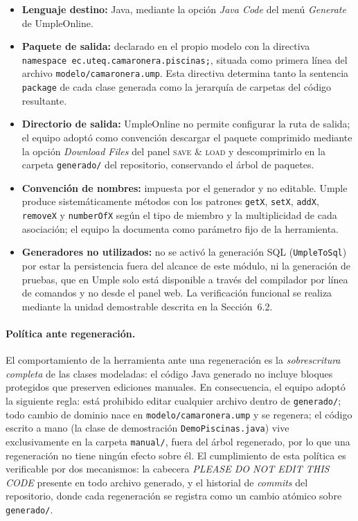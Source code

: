 \begin{itemize}
  \item \textbf{Lenguaje destino:} Java, mediante la opción
        \emph{Java Code} del menú \emph{Generate} de UmpleOnline.
  \item \textbf{Paquete de salida:} declarado en el propio modelo con
        la directiva \texttt{namespace ec.uteq.camaronera.piscinas;},
        situada como primera línea del archivo
        \texttt{modelo/camaronera.ump}. Esta directiva determina tanto
        la sentencia \texttt{package} de cada clase generada como la
        jerarquía de carpetas del código resultante.
  \item \textbf{Directorio de salida:} UmpleOnline no permite
        configurar la ruta de salida; el equipo adoptó como convención
        descargar el paquete comprimido mediante la opción
        \emph{Download Files} del panel \textsc{save \& load} y
        descomprimirlo en la carpeta \texttt{generado/} del
        repositorio, conservando el árbol de paquetes.
  \item \textbf{Convención de nombres:} impuesta por el generador y no
        editable. Umple produce sistemáticamente métodos con los
        patrones \texttt{getX}, \texttt{setX}, \texttt{addX},
        \texttt{removeX} y \texttt{numberOfX} según el tipo de miembro
        y la multiplicidad de cada asociación; el equipo la documenta
        como parámetro fijo de la herramienta.
  \item \textbf{Generadores no utilizados:} no se activó la generación
        SQL (\texttt{UmpleToSql}) por estar la persistencia fuera del
        alcance de este módulo, ni la generación de pruebas, que en
        Umple solo está disponible a través del compilador por línea
        de comandos y no desde el panel web. La verificación funcional
        se realiza mediante la unidad demostrable descrita en la
        Sección~6.2.
\end{itemize}

\paragraph{Política ante regeneración.}
El comportamiento de la herramienta ante una regeneración es la
\emph{sobrescritura completa} de las clases modeladas: el código Java
generado no incluye bloques protegidos que preserven ediciones
manuales. En consecuencia, el equipo adoptó la siguiente regla: está
prohibido editar cualquier archivo dentro de \texttt{generado/}; todo
cambio de dominio nace en \texttt{modelo/camaronera.ump} y se
regenera; el código escrito a mano (la clase de demostración
\texttt{DemoPiscinas.java}) vive exclusivamente en la carpeta
\texttt{manual/}, fuera del árbol regenerado, por lo que una
regeneración no tiene ningún efecto sobre él. El cumplimiento de esta
política es verificable por dos mecanismos: la cabecera
\emph{PLEASE DO NOT EDIT THIS CODE} presente en todo archivo generado,
y el historial de \emph{commits} del repositorio, donde cada
regeneración se registra como un cambio atómico sobre
\texttt{generado/}.

